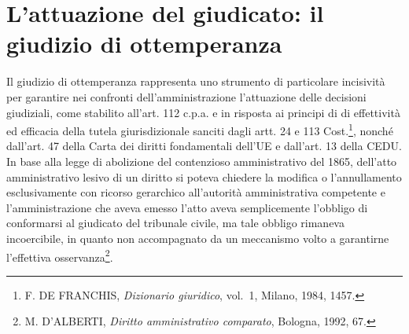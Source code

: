 \documentclass[12pt,it,a4paper,]{report}
\begin{document}
\hypertarget{lattuazione-del-giudicato-il-giudizio-di-ottemperanza}{%
\section{L'attuazione del giudicato: il giudizio di
ottemperanza}\label{lattuazione-del-giudicato-il-giudizio-di-ottemperanza}}

Il giudizio di ottemperanza rappresenta uno strumento di particolare
incisività per garantire nei confronti dell'amministrazione l'attuazione
delle decisioni giudiziali, come stabilito all'art. 112 c.p.a. e in
risposta ai principi di di effettività ed efficacia della tutela
giurisdizionale sanciti dagli artt. 24 e 113 Cost.\footnote{F. DE
  FRANCHIS, \emph{Dizionario giuridico}, vol.~1, Milano, 1984, 1457.},
nonché dall'art. 47 della Carta dei diritti fondamentali dell'UE e
dall'art. 13 della CEDU. In base alla legge di abolizione del
contenzioso amministrativo del 1865, dell'atto amministrativo lesivo di
un diritto si poteva chiedere la modifica o l'annullamento
esclusivamente con ricorso gerarchico all'autorità amministrativa
competente e l'amministrazione che aveva emesso l'atto aveva
semplicemente l'obbligo di conformarsi al giudicato del tribunale
civile, ma tale obbligo rimaneva incoercibile, in quanto non
accompagnato da un meccanismo volto a garantirne l'effettiva
osservanza\footnote{M. D'ALBERTI, \emph{Diritto amministrativo
  comparato}, Bologna, 1992, 67.}.
\end{document}

